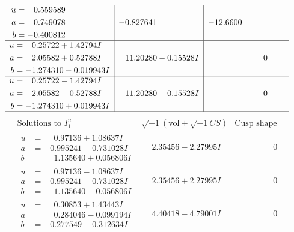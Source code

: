 \documentclass[1p]{elsarticle_modified}
\theoremstyle{definition}
\newcommand{\I}{\sqrt{-1}}
\begin{document}
$$\begin{array}{c|c|c}
\begin{aligned}
u &= \phantom{-}0.559589\phantom{ +0.000000I} \\
a &= \phantom{-}0.749078\phantom{ +0.000000I} \\
b &= -0.400812\phantom{ +0.000000I}\end{aligned}
 & -0.827641\phantom{ +0.000000I} & -12.6600\phantom{ +0.000000I} \\ \hline\begin{aligned}
u &= \phantom{-}0.25722 + 1.42794 I \\
a &= \phantom{-}2.05582 + 0.52788 I \\
b &= -1.274310 - 0.019943 I\end{aligned}
 & \phantom{-}11.20280 - 0.15528 I & \phantom{-0.000000 } 0 \\ \hline\begin{aligned}
u &= \phantom{-}0.25722 - 1.42794 I \\
a &= \phantom{-}2.05582 - 0.52788 I \\
b &= -1.274310 + 0.019943 I\end{aligned}
 & \phantom{-}11.20280 + 0.15528 I & \phantom{-0.000000 } 0\\
 \hline 
 \end{array}$$\newpage$$\begin{array}{c|c|c}  
\text{Solutions to }I^u_{1}& \I (\text{vol} + \sqrt{-1}CS) & \text{Cusp shape}\\
 \hline 
\begin{aligned}
u &= \phantom{-}0.97136 + 1.08637 I \\
a &= -0.995241 - 0.731028 I \\
b &= \phantom{-}1.135640 + 0.056806 I\end{aligned}
 & \phantom{-}2.35456 - 2.27995 I & \phantom{-0.000000 } 0 \\ \hline\begin{aligned}
u &= \phantom{-}0.97136 - 1.08637 I \\
a &= -0.995241 + 0.731028 I \\
b &= \phantom{-}1.135640 - 0.056806 I\end{aligned}
 & \phantom{-}2.35456 + 2.27995 I & \phantom{-0.000000 } 0 \\ \hline\begin{aligned}
u &= \phantom{-}0.30853 + 1.43443 I \\
a &= \phantom{-}0.284046 - 0.099194 I \\
b &= -0.277549 - 0.312634 I\end{aligned}
 & \phantom{-}4.40418 - 4.79001 I & \phantom{-0.000000 } 0 \\ \hline\begin{aligned}

\end{aligned}
\end{array}$$
\end{document}
